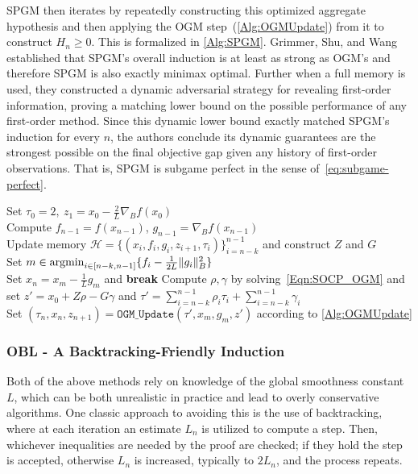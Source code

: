 \documentclass[11pt]{article}
\numberwithin{equation}{section}
\newcommand{\argmin}{\operatornamewithlimits{argmin}}
\newcommand{\R}{\mathbb{R}}
\newcommand{\gradB}{\nabla_{\!\!{\scriptscriptstyle B}}}
\newcommand{\Ucoef}{\rho}
\newcommand{\Wcoef}{\gamma}
\newcommand{\Mem}{\mathcal{H}}
\newcommand{\idxMem}{k}
\newcommand{\ip}[2]{\sum_{i={n-\idxMem}}^{n-1} {#1}_i {#2}_i}
\newcommand{\fullSum}[1]{\sum_{i={n-\idxMem}}^{n-1} {#1}_i}
\theoremstyle{definition}
\theoremstyle{plain}
\theoremstyle{definition}
\begin{document}
SPGM then iterates by repeatedly constructing this optimized aggregate hypothesis and then applying the OGM step~(\cref{Alg:OGMUpdate}) from it to construct $H_n \geq 0$. This is formalized in \cref{Alg:SPGM}. Grimmer, Shu, and Wang~\cite{SPGM} established that SPGM's overall induction is at least as strong as OGM's and therefore SPGM is also exactly minimax optimal.
Further when a full memory is used, they constructed a dynamic adversarial strategy for revealing first-order information, proving a matching lower bound on the possible performance of any first-order method. Since this dynamic lower bound exactly matched SPGM's induction for every $n$, the authors conclude its dynamic guarantees are the strongest possible on the final objective gap given any history of first-order observations. That is, SPGM is subgame perfect in the sense of~\eqref{eq:subgame-perfect}.


\begin{algorithm}
\caption{SPGM} \label{Alg:SPGM} 
    \Input{ Convex function $f$, memory size $k \in \mathbb{N}$, $x_0 \in \R^d$, $L > 0$, $B \succ 0$}
    Set $\tau_0 = 2, \ z_1 = x_0 - \frac{2}{L} \gradB f(x_0)$\\
        {Compute $f_{n-1} = f(x_{n-1})$, $g_{n-1} = \gradB f(x_{n-1})$ \\
        Update memory $\Mem = \{(x_i,f_i,g_i,z_{i+1},\tau_i)\}_{i=n-k}^{n-1}$ and construct $Z$ and $G$ \\
        Set $m\in\argmin_{i \in [n-\idxMem, n-1]}\{f_i - \frac{1}{2L}\|g_i\|^2_B\}$ \\
            {Set $x_n = x_m - \frac{1}{L} g_m$ and \textbf{break}}
        Compute $\Ucoef,\Wcoef$ by solving~\eqref{Eqn:SOCP_OGM} and set $z' = x_0 + Z\Ucoef - G\Wcoef$ and $\tau' = \ip{ \Ucoef}{\tau} + \fullSum{\Wcoef} $ \\
        Set $(\tau_n,x_n,z_{n+1}) = \texttt{OGM\_Update}(\tau', x_m, g_m, z')$ according to \cref{Alg:OGMUpdate}}
\end{algorithm}

\subsubsection{OBL - A Backtracking-Friendly Induction} \label{SubSec:OBL}
Both of the above methods rely on knowledge of the global smoothness constant $L$, which can be both unrealistic in practice and lead to overly conservative algorithms. One classic approach to avoiding this is the use of backtracking, where at each iteration an estimate $L_n$ is utilized to compute a step. Then, whichever inequalities are needed by the proof are checked; if they hold the step is accepted, otherwise $L_n$ is increased, typically to $2L_n$, and the process repeats.
\end{document}
